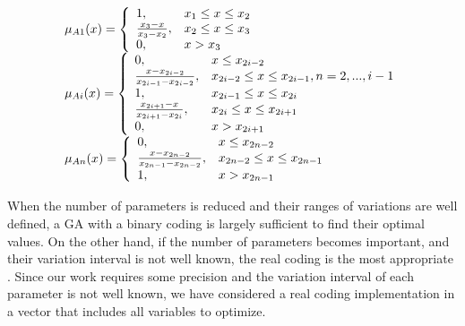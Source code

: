 \documentclass[sigconf]{acmart}
\begin{document}
\begin{equation} 
\begin{tabular}{l}
$\mu_{A1}(x)=  \left \{
\begin{array}{ll}
1, &x_{1} \leq x \leq x_{2}\\
\frac{x_{3} - x}{x_{3} - x_{2}}, &x_{2} \leq x \leq x_{3}\\
0        , &x > x_{3}\\
\end{array} 
\right.$		\\ 	
$\mu_{Ai}(x)= \left \{
\begin{array}{ll} 
0, &x \leq x_{2i-2}\\
\frac{x - x_{2i-2}}{x_{2i-1} - x_{2i-2}}, &x_{2i-2} \leq x \leq x_{2i-1},n=2,...,i-1\\
1, & x_{2i-1} \leq x \leq x_{2i}\\
\frac{x_{2i+1} - x}{x_{2i+1} - x_{2i}},& x_{2i} \leq x \leq x_{2i+1}\\
0  , &x > x_{2i+1}\\
\end{array}  
\right.	$		\\
$\mu_{An}(x)= \left \{
\begin{array}{ll} 
0, &x \leq x_{2n-2}\\
\frac{x - x_{2n-2}}{x_{2n-1} - x_{2n-2}},& x_{2n-2} \leq x \leq x_{2n-1}\\
1 ,& x > x_{2n-1} 
\end{array} 
\right.$\\
\label{eq:e1}
\end{tabular}
\end{equation}


When the number of parameters is reduced and their ranges of variations are well defined, a GA with a binary coding is largely sufficient to find their optimal values. On the other hand, if the number of parameters becomes important, and their variation interval is not well known, the real coding is the most appropriate \cite{elsayed13}. 
Since our work requires some precision and the variation interval of
each parameter is not well known, we have considered a real coding
implementation in a vector that includes all variables to optimize.
\end{document}
